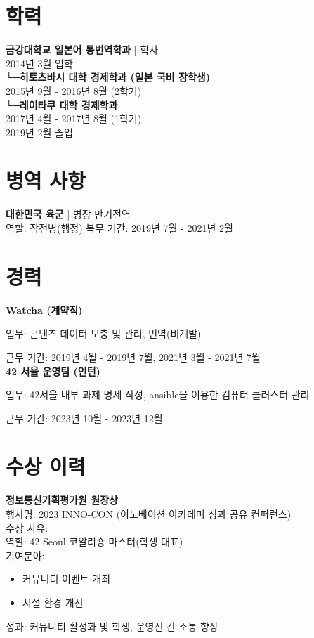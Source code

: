 \documentclass[11pt, a4paper]{article}
\begin{document}
\section{학력}
\textbf{금강대학교 일본어 통번역학과} | 학사\\
2014년 3월 입학\\
\hspace*{0.5cm}└─\textbf{히토츠바시 대학 경제학과 (일본 국비 장학생)}\\
\hspace*{1cm}2015년 9월 - 2016년 8월 (2학기)\\
\hspace*{0.5cm}└─\textbf{레이타쿠 대학 경제학과}\\
\hspace*{1cm}2017년 4월 - 2017년 8월 (1학기)\\
2019년 2월 졸업

\section{병역 사항}
\textbf{대한민국 육군} | 병장 만기전역\\
역할: 작전병(행정)
복무 기간: 2019년 7월 - 2021년 2월

\section{경력}
\textbf{Watcha (계약직)}

업무: 콘텐츠 데이터 보충 및 관리, 번역(비계발)

근무 기간: 2019년 4월 - 2019년 7월, 2021년 3월 - 2021년 7월\\
\textbf{42 서울 운영팀 (인턴)}

업무: 42서울 내부 과제 명세 작성, ansible을 이용한 컴퓨터 클러스터 관리

근무 기간: 2023년 10월 - 2023년 12월

\section{수상 이력}
\textbf{정보통신기획평가원 원장상}\\
\hspace*{0.5cm}행사명: 2023 INNO-CON (이노베이션 아카데미 성과 공유 컨퍼런스)\\
\hspace*{0.5cm}수상 사유:\\
\hspace*{1cm}역할: 42 Seoul 코알리숑 마스터(학생 대표)\\
\hspace*{1cm}기여분야:
\begin{itemize}
    \begin{itemize}
        \item 커뮤니티 이벤트 개최
        \item 시설 환경 개선
    \end{itemize}
\end{itemize}
\hspace*{0.5cm}성과: 커뮤니티 활성화 및 학생, 운영진 간 소통 향상
\end{document}

